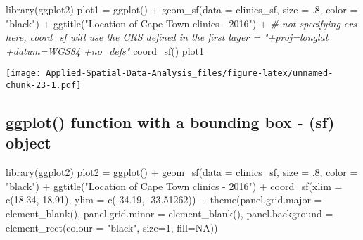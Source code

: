 \documentclass[
]{book}
\newenvironment{Shaded}{\begin{snugshade}}{\end{snugshade}}
\newcommand{\AttributeTok}[1]{\textcolor[rgb]{0.77,0.63,0.00}{#1}}
\newcommand{\CommentTok}[1]{\textcolor[rgb]{0.56,0.35,0.01}{\textit{#1}}}
\newcommand{\ConstantTok}[1]{\textcolor[rgb]{0.00,0.00,0.00}{#1}}
\newcommand{\DecValTok}[1]{\textcolor[rgb]{0.00,0.00,0.81}{#1}}
\newcommand{\FloatTok}[1]{\textcolor[rgb]{0.00,0.00,0.81}{#1}}
\newcommand{\FunctionTok}[1]{\textcolor[rgb]{0.00,0.00,0.00}{#1}}
\newcommand{\NormalTok}[1]{#1}
\newcommand{\OtherTok}[1]{\textcolor[rgb]{0.56,0.35,0.01}{#1}}
\newcommand{\SpecialCharTok}[1]{\textcolor[rgb]{0.00,0.00,0.00}{#1}}
\newcommand{\StringTok}[1]{\textcolor[rgb]{0.31,0.60,0.02}{#1}}
\begin{document}
\begin{Shaded}
\begin{Highlighting}[]
\FunctionTok{library}\NormalTok{(ggplot2)}
\NormalTok{plot1 }\OtherTok{=} \FunctionTok{ggplot}\NormalTok{() }\SpecialCharTok{+} 
  \FunctionTok{geom\_sf}\NormalTok{(}\AttributeTok{data =}\NormalTok{ clinics\_sf, }\AttributeTok{size =}\NormalTok{ .}\DecValTok{8}\NormalTok{, }\AttributeTok{color =} \StringTok{"black"}\NormalTok{) }\SpecialCharTok{+} 
  \FunctionTok{ggtitle}\NormalTok{(}\StringTok{"Location of Cape Town clinics {-} 2016"}\NormalTok{) }\SpecialCharTok{+} 
  \CommentTok{\# not specifying crs here, coord\_sf will use the CRS defined in the first layer = "+proj=longlat +datum=WGS84 +no\_defs"}
  \FunctionTok{coord\_sf}\NormalTok{() }
\NormalTok{plot1}
\end{Highlighting}
\end{Shaded}

\texttt{[image: Applied-Spatial-Data-Analysis\_files/figure-latex/unnamed-chunk-23-1.pdf]}

\hypertarget{ggplot-function-with-a-bounding-box---sf-object}{%
\subsection{ggplot() function with a bounding box - (sf) object}\label{ggplot-function-with-a-bounding-box---sf-object}}

\begin{Shaded}
\begin{Highlighting}[]
\FunctionTok{library}\NormalTok{(ggplot2)}
\NormalTok{plot2 }\OtherTok{=} \FunctionTok{ggplot}\NormalTok{() }\SpecialCharTok{+} 
  \FunctionTok{geom\_sf}\NormalTok{(}\AttributeTok{data =}\NormalTok{ clinics\_sf, }\AttributeTok{size =}\NormalTok{ .}\DecValTok{8}\NormalTok{, }\AttributeTok{color =} \StringTok{"black"}\NormalTok{) }\SpecialCharTok{+} 
  \FunctionTok{ggtitle}\NormalTok{(}\StringTok{"Location of Cape Town clinics {-} 2016"}\NormalTok{) }\SpecialCharTok{+} 
  \FunctionTok{coord\_sf}\NormalTok{(}\AttributeTok{xlim =} \FunctionTok{c}\NormalTok{(}\FloatTok{18.34}\NormalTok{, }\FloatTok{18.91}\NormalTok{), }\AttributeTok{ylim =} \FunctionTok{c}\NormalTok{(}\SpecialCharTok{{-}}\FloatTok{34.19}\NormalTok{, }\SpecialCharTok{{-}}\FloatTok{33.51262}\NormalTok{)) }\SpecialCharTok{+}
  \FunctionTok{theme}\NormalTok{(}\AttributeTok{panel.grid.major =} \FunctionTok{element\_blank}\NormalTok{(), }
        \AttributeTok{panel.grid.minor =} \FunctionTok{element\_blank}\NormalTok{(),}
        \AttributeTok{panel.background =} \FunctionTok{element\_rect}\NormalTok{(}\AttributeTok{colour =} \StringTok{"black"}\NormalTok{, }\AttributeTok{size=}\DecValTok{1}\NormalTok{, }\AttributeTok{fill=}\ConstantTok{NA}\NormalTok{))}
\end{Highlighting}
\end{Shaded}
\end{document}
